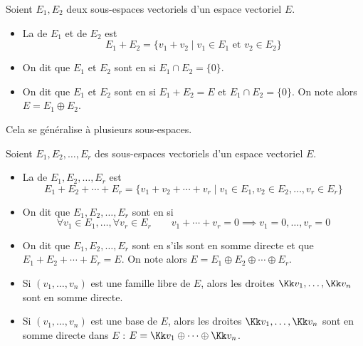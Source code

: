 \documentclass[12pt, class=report,crop=false]{standalone}
\begin{document}
\begin{definition}
Soient $E_1,E_2$ deux sous-espaces vectoriels d'un espace vectoriel $E$.
\begin{itemize}
  \item La  de $E_1$ et de $E_2$ est
  $$E_1+E_2 = \big\{  v_1 + v_2 \mid v_1 \in E_1 \text{ et } v_2 \in E_2 \big\}$$
  
 
  \item On dit que $E_1$ et $E_2$ sont en  si $E_1 \cap E_2 = \{0\}$.
   

  \item On dit que $E_1$ et $E_2$ sont en  si 
  $E_1 + E_2 = E$ et $E_1 \cap E_2 = \{0\}$. On note alors
  $E = E_1 \oplus E_2$.
  
\end{itemize}
\end{definition}

Cela se généralise à plusieurs sous-espaces.
\begin{definition}
Soient $E_1,E_2, \ldots,E_r$ des sous-espaces vectoriels d'un espace vectoriel $E$.
\begin{itemize}
  \item La  de $E_1,E_2, \ldots,E_r$ est
  $$E_1+E_2+\cdots + E_r = \big\{  v_1 + v_2 + \cdots + v_r \mid v_1 \in E_1, v_2 \in E_2,\ldots,v_r \in E_r \big\}$$  
 
 
  \item On dit que $E_1,E_2,\ldots,E_r$ sont en  si 
  \[\forall v_1 \in E_1,\ldots,\forall v_r \in E_r \qquad v_1+ \cdots +v_r = 0 \implies v_1=0,\ldots, v_r = 0\]

  \item On dit que $E_1,E_2,\ldots,E_r$ sont en  s'ils sont en somme directe et que $E_1+E_2+\cdots+E_r=E$.  
  On note alors $E = E_1 \oplus E_2 \oplus \cdots \oplus E_r $.
\end{itemize}
\end{definition}

\begin{exemple}
\sauteligne
\begin{itemize}
  \item Si $(v_1,\ldots,v_n)$ est une famille libre de $E$, alors les droites $\Kk v_1,\ldots,\Kk v_n$ sont en somme directe. 

  \item Si $(v_1,\ldots,v_n)$ est une base de $E$, alors les droites $\Kk v_1,\ldots,\Kk v_n$ sont en somme directe dans $E$ :  $E = \Kk v_1 \oplus \cdots \oplus \Kk v_n$.
\end{itemize}
\end{exemple}
\end{document}
